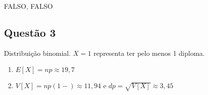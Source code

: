 \documentclass[
]{article}
\begin{document}
FALSO, FALSO

\hypertarget{questuxe3o-3-1}{%
\subsection{Questão 3}\label{questuxe3o-3-1}}

Distribuição binomial. \(X=1\) representa ter pelo menos 1 diploma.

\begin{enumerate}
\def\labelenumi{\alph{enumi})}
\item
  \(E[X]=np \approx 19,7\)
\item
  \(V[X]=np(1-)\approx 11,94\) e \(dp=\sqrt{V[X]} \approx 3,45\)
\end{enumerate}
\end{document}

